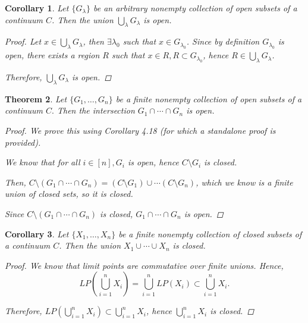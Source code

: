 \documentclass[11pt]{article}
\renewcommand{\_}[1]{\underline{ #1 }}
\newtheorem{theorem}{Theorem}[section]
\newtheorem{corollary}[theorem]{Corollary}
\theoremstyle{definition}
\numberwithin{equation}{subsection}
\begin{document}
\begin{corollary}  Let $\{G_{\lambda} \}$ be an arbitrary nonempty collection of open subsets of a continuum $C$.  Then the union $\bigcup_{\lambda} G_{\lambda}$ is open.  
\begin{proof}

Let $x \in \bigcup_{\lambda} G_{\lambda}$, then $\exists \lambda_0$ such that $x \in G_{\lambda_0}$. Since by definition $G_{\lambda_0}$ is open, there exists a region $R$ such that $x \in R, R \subset G_{\lambda_0}$, hence $R \in \bigcup_{\lambda} G_{\lambda}$. 

Therefore, $\bigcup_{\lambda} G_{\lambda}$ is open.

\renewcommand\qedsymbol{QED}
\end{proof}
\end{corollary}

\begin{theorem} \label{*} Let $\{G_1, \dotsc, G_n\}$ be a finite nonempty collection of open subsets of a continuum $C.$  Then the intersection $G_1 \cap \dotsm \cap G_n$ is open.
\begin{proof}
We prove this using Corollary 4.18 (for which a standalone proof is provided).

We know that for all $i \in [n], G_i$ is open, hence $C \setminus G_i$ is closed.

Then, $C \setminus (G_1 \cap \dotsm \cap G_n) = (C \setminus G_1) \cup \dotsm (C \setminus G_n)$, which we know is a finite union of closed sets, so it is closed.

Since $C \setminus (G_1 \cap \dotsm \cap G_n)$ is closed, $G_1 \cap \dotsm \cap G_n$ is open.

\renewcommand\qedsymbol{QED}
\end{proof}
\end{theorem}



\begin{corollary}\label{fortop2}    Let $\{X_1, \dotsc, X_n\}$ be a finite nonempty collection of closed subsets of a continuum $C$.  Then the union $X_1 \cup \dotsm \cup X_n$ is closed.
\begin{proof}
We know that limit points are commutative over finite unions. Hence, 
\[
LP(\bigcup_{i=1}^n{X_i}) = \bigcup_{i=1}^n{LP(X_i)} \subset \bigcup_{i=1}^n{X_i}.
\]

Therefore, $LP(\bigcup_{i=1}^n{X_i}) \subset \bigcup_{i=1}^n{X_i}$, hence $\bigcup_{i=1}^n{X_i}$ is closed.

\renewcommand\qedsymbol{QED}
\end{proof}
\end{corollary}
\end{document}
